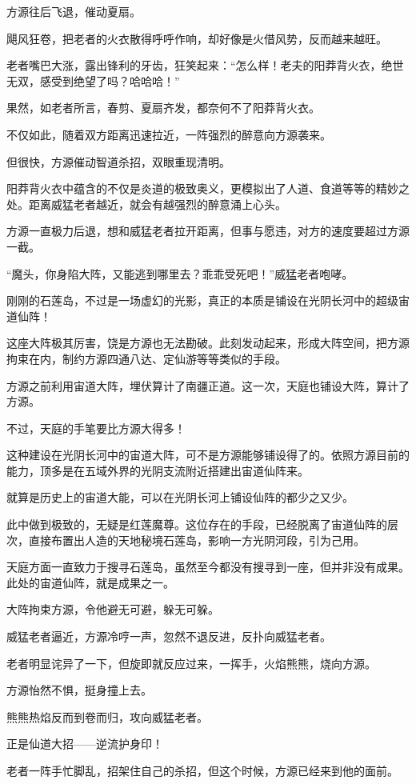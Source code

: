 \begin{this_body}
方源往后飞退，催动夏扇。

飓风狂卷，把老者的火衣散得呼呼作响，却好像是火借风势，反而越来越旺。

老者嘴巴大涨，露出锋利的牙齿，狂笑起来：“怎么样！老夫的阳莽背火衣，绝世无双，感受到绝望了吗？哈哈哈！”

果然，如老者所言，春剪、夏扇齐发，都奈何不了阳莽背火衣。

不仅如此，随着双方距离迅速拉近，一阵强烈的醉意向方源袭来。

但很快，方源催动智道杀招，双眼重现清明。

阳莽背火衣中蕴含的不仅是炎道的极致奥义，更模拟出了人道、食道等等的精妙之处。距离威猛老者越近，就会有越强烈的醉意涌上心头。

方源一直极力后退，想和威猛老者拉开距离，但事与愿违，对方的速度要超过方源一截。

“魔头，你身陷大阵，又能逃到哪里去？乖乖受死吧！”威猛老者咆哮。

刚刚的石莲岛，不过是一场虚幻的光影，真正的本质是铺设在光阴长河中的超级宙道仙阵！

这座大阵极其厉害，饶是方源也无法勘破。此刻发动起来，形成大阵空间，把方源拘束在内，制约方源四通八达、定仙游等等类似的手段。

方源之前利用宙道大阵，埋伏算计了南疆正道。这一次，天庭也铺设大阵，算计了方源。

不过，天庭的手笔要比方源大得多！

这种建设在光阴长河中的宙道大阵，可不是方源能够铺设得了的。依照方源目前的能力，顶多是在五域外界的光阴支流附近搭建出宙道仙阵来。

就算是历史上的宙道大能，可以在光阴长河上铺设仙阵的都少之又少。

此中做到极致的，无疑是红莲魔尊。这位存在的手段，已经脱离了宙道仙阵的层次，直接布置出人造的天地秘境石莲岛，影响一方光阴河段，引为己用。

天庭方面一直致力于搜寻石莲岛，虽然至今都没有搜寻到一座，但并非没有成果。此处的宙道仙阵，就是成果之一。

大阵拘束方源，令他避无可避，躲无可躲。

威猛老者逼近，方源冷哼一声，忽然不退反进，反扑向威猛老者。

老者明显诧异了一下，但旋即就反应过来，一挥手，火焰熊熊，烧向方源。

方源怡然不惧，挺身撞上去。

熊熊热焰反而到卷而归，攻向威猛老者。

正是仙道大招——逆流护身印！

老者一阵手忙脚乱，招架住自己的杀招，但这个时候，方源已经来到他的面前。


\end{this_body}
